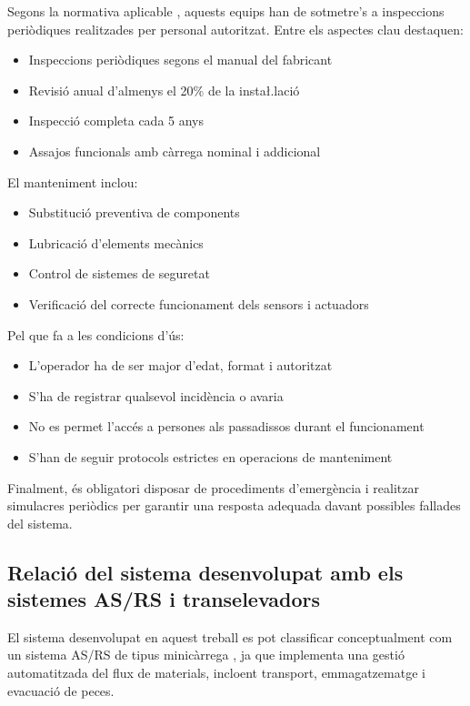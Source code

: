 \documentclass[a4paper,11pt,DIV=13,headings=normal,abstract=true,twoside=semi]{article}
\newcommand{\acro}[1]{\textsc{#1}}
\begin{document}
Segons la normativa aplicable \cite{manual_logistica}, aquests equips han de sotmetre's a inspeccions periòdiques realitzades per personal autoritzat. Entre els aspectes clau destaquen:

\begin{itemize}
    \item Inspeccions periòdiques segons el manual del fabricant
    \item Revisió anual d'almenys el 20\% de la insta\l.lació
    \item Inspecció completa cada 5 anys
    \item Assajos funcionals amb càrrega nominal i addicional
\end{itemize}

El manteniment inclou:

\begin{itemize}
    \item Substitució preventiva de components
    \item Lubricació d'elements mecànics
    \item Control de sistemes de seguretat
    \item Verificació del correcte funcionament dels sensors i actuadors
\end{itemize}

Pel que fa a les condicions d'ús:

\begin{itemize}
    \item L'operador ha de ser major d'edat, format i autoritzat
    \item S'ha de registrar qualsevol incidència o avaria
    \item No es permet l'accés a persones als passadissos durant el funcionament
    \item S'han de seguir protocols estrictes en operacions de manteniment
\end{itemize}

Finalment, és obligatori disposar de procediments d'emergència i realitzar simulacres periòdics per garantir una resposta adequada davant possibles fallades del sistema.

\subsection{Relació del sistema desenvolupat amb els sistemes AS/RS i transelevadors}

El sistema desenvolupat en aquest treball es pot classificar conceptualment com un sistema \acro{AS/RS} de tipus minicàrrega \cite{asrs_daifuku}, ja que implementa una gestió automatitzada del flux de materials, incloent transport, emmagatzematge i evacuació de peces.
\end{document}
